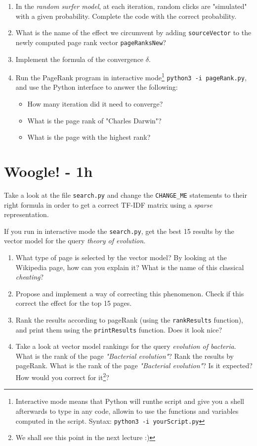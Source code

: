 \documentclass[mathserif, 11pt,c]{article}
\begin{document}
\begin{enumerate}[label=\textbf{Q\thesection.\arabic*}]
	\item In the \textit{random surfer model}, at each iteration, random clicks are "simulated" with a given probability. Complete the code with the correct probability.
	\item What is the name of the effect we circumvent by adding \texttt{sourceVector} to the newly computed page rank vector \texttt{pageRanksNew}?
	\item Implement the formula of the convergence $\delta$.
	\item Run the PageRank program in interactive mode\footnote{Interactive mode means that Python will runthe script and give you a shell afterwards to type in any code, allowin to use the functions and variables computed in the script. Syntax: \texttt{python3 -i yourScript.py}} \texttt{python3 -i pageRank.py}, and use the Python interface to answer the following:
	\begin{itemize}
		\item How many iteration did it need to converge?
		\item What is the page rank of "Charles Darwin"?
		\item What is the page with the highest rank?
	\end{itemize}
\end{enumerate}

\section{Woogle! - 1h}


Take a look at the file \texttt{search.py} and change the \texttt{CHANGE\_ME} statements to their right formula in order to get a correct TF-IDF matrix using a \textit{sparse }representation.

If you run in interactive mode the \texttt{search.py}, get the best 15 results by the vector model for the query \textit{theory of evolution}.

\begin{enumerate}[label=\textbf{Q\thesection.\arabic*}]
	\item What type of page is selected by the vector model? By looking at the Wikipedia page, how can you explain it? What is the name of this classical \textit{cheating}?
	\item Propose and implement a way of correcting this phenomenon. Check if this correct the effect for the top 15 pages.
	\item Rank the results according to pageRank (using the \texttt{rankResults} function), and print them using the \texttt{printResults} function. Does it look nice?
	\item Take a look at vector model rankings for the query \textit{evolution of bacteria}. What is the rank of the page \textit{"Bacterial evolution"}? Rank the results by pageRank. What is the rank of the page \textit{"Bacterial evolution"}? Is it expected? How would you correct for it\footnote{We shall see this point in the next lecture :)}?
\end{enumerate}
\end{document}
